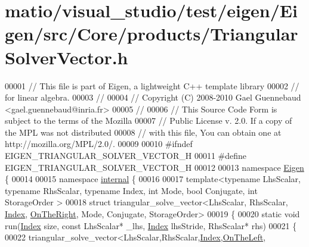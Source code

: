 \hypertarget{matio_2visual__studio_2test_2eigen_2_eigen_2src_2_core_2products_2_triangular_solver_vector_8h_source}{}\section{matio/visual\+\_\+studio/test/eigen/\+Eigen/src/\+Core/products/\+Triangular\+Solver\+Vector.h}
\label{matio_2visual__studio_2test_2eigen_2_eigen_2src_2_core_2products_2_triangular_solver_vector_8h_source}

\begin{DoxyCode}
00001 \textcolor{comment}{// This file is part of Eigen, a lightweight C++ template library}
00002 \textcolor{comment}{// for linear algebra.}
00003 \textcolor{comment}{//}
00004 \textcolor{comment}{// Copyright (C) 2008-2010 Gael Guennebaud <gael.guennebaud@inria.fr>}
00005 \textcolor{comment}{//}
00006 \textcolor{comment}{// This Source Code Form is subject to the terms of the Mozilla}
00007 \textcolor{comment}{// Public License v. 2.0. If a copy of the MPL was not distributed}
00008 \textcolor{comment}{// with this file, You can obtain one at http://mozilla.org/MPL/2.0/.}
00009 
00010 \textcolor{preprocessor}{#ifndef EIGEN\_TRIANGULAR\_SOLVER\_VECTOR\_H}
00011 \textcolor{preprocessor}{#define EIGEN\_TRIANGULAR\_SOLVER\_VECTOR\_H}
00012 
00013 \textcolor{keyword}{namespace }\hyperlink{namespace_eigen}{Eigen} \{
00014 
00015 \textcolor{keyword}{namespace }\hyperlink{namespaceinternal}{internal} \{
00016 
00017 \textcolor{keyword}{template}<\textcolor{keyword}{typename} LhsScalar, \textcolor{keyword}{typename} RhsScalar, \textcolor{keyword}{typename} Index, \textcolor{keywordtype}{int} Mode, \textcolor{keywordtype}{bool} Conjugate, \textcolor{keywordtype}{int} StorageOrder
      >
00018 \textcolor{keyword}{struct }triangular\_solve\_vector<LhsScalar, RhsScalar, \hyperlink{namespace_eigen_a62e77e0933482dafde8fe197d9a2cfde}{Index}, \hyperlink{group__enums_ggac22de43beeac7a78b384f99bed5cee0ba99dc75d8e00b6c3a5bdc31940f47492b}{OnTheRight}, Mode, Conjugate, 
      StorageOrder>
00019 \{
00020   \textcolor{keyword}{static} \textcolor{keywordtype}{void} run(\hyperlink{namespace_eigen_a62e77e0933482dafde8fe197d9a2cfde}{Index} size, \textcolor{keyword}{const} LhsScalar* \_lhs, \hyperlink{namespace_eigen_a62e77e0933482dafde8fe197d9a2cfde}{Index} lhsStride, RhsScalar* rhs)
00021   \{
00022     triangular\_solve\_vector<LhsScalar,RhsScalar,\hyperlink{namespace_eigen_a62e77e0933482dafde8fe197d9a2cfde}{Index},\hyperlink{group__enums_ggac22de43beeac7a78b384f99bed5cee0ba129609b3bdf23b071f5f86cf2f995ec4}{OnTheLeft},

\end{DoxyCode}
